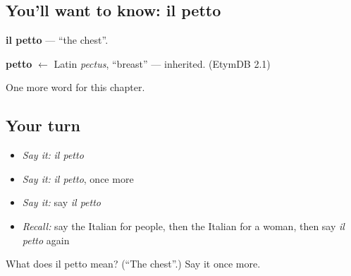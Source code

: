\subsection*{You'll want to know: il petto}
\textbf{il petto} — \textquotedblleft{}the chest\textquotedblright{}.

\begin{cousinweb}
\textbf{petto} $\leftarrow$ Latin \emph{pectus}, \textquotedblleft{}breast\textquotedblright{} — inherited. (EtymDB 2.1)
\end{cousinweb}

\begin{grammarlens}[title={What you've built}]
One more word for this chapter.
\end{grammarlens}

\subsection*{Your turn}
\begin{itemize}
\raggedright
  \item \emph{Say it:} \emph{il petto}
  \item \emph{Say it:} \emph{il petto}, once more
  \item \emph{Say it:} say \emph{il petto}
  \item \emph{Recall:} say the Italian for people, then the Italian for a woman, then say \emph{il petto} again
\end{itemize}

\begin{tcolorbox}[breakable,colback=teal!4,colframe=teal!35!black,title={Before you move on}]
What does il petto mean? (\textquotedblleft{}The chest\textquotedblright{}.) Say it once more.
\end{tcolorbox}
